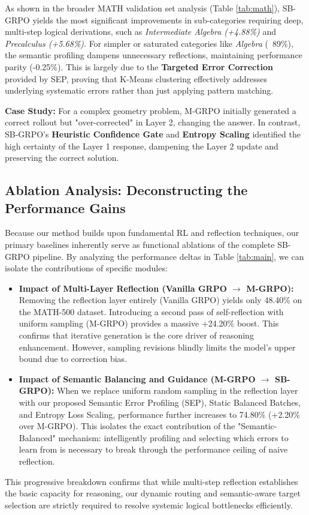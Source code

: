 \documentclass[runningheads]{llncs}
\begin{document}
As shown in the broader MATH validation set analysis (Table \ref{tab:math}), SB-GRPO yields the most significant improvements in sub-categories requiring deep, multi-step logical derivations, such as \textit{Intermediate Algebra (+4.88\%)} and \textit{Precalculus (+5.68\%)}. For simpler or saturated categories like \textit{Algebra} (~89\%), the semantic profiling dampens unnecessary reflections, maintaining performance parity (-0.25\%). This is largely due to the \textbf{Targeted Error Correction} provided by SEP, proving that K-Means clustering effectively addresses underlying systematic errors rather than just applying pattern matching.

\textbf{Case Study:} For a complex geometry problem, M-GRPO initially generated a correct rollout but "over-corrected" in Layer 2, changing the answer. In contrast, SB-GRPO's \textbf{Heuristic Confidence Gate} and \textbf{Entropy Scaling} identified the high certainty of the Layer 1 response, dampening the Layer 2 update and preserving the correct solution.

\subsection{Ablation Analysis: Deconstructing the Performance Gains}
Because our method builds upon fundamental RL and reflection techniques, our primary baselines inherently serve as functional ablations of the complete SB-GRPO pipeline. By analyzing the performance deltas in Table \ref{tab:main}, we can isolate the contributions of specific modules:

\begin{itemize}
    \item \textbf{Impact of Multi-Layer Reflection (Vanilla GRPO $\rightarrow$ M-GRPO):} Removing the reflection layer entirely (Vanilla GRPO) yields only 48.40\% on the MATH-500 dataset. Introducing a second pass of self-reflection with uniform sampling (M-GRPO) provides a massive +24.20\% boost. This confirms that iterative generation is the core driver of reasoning enhancement. However, sampling revisions blindly limits the model's upper bound due to correction bias.
    \item \textbf{Impact of Semantic Balancing and Guidance (M-GRPO $\rightarrow$ SB-GRPO):} When we replace uniform random sampling in the reflection layer with our proposed Semantic Error Profiling (SEP), Static Balanced Batches, and Entropy Loss Scaling, performance further increases to 74.80\% (+2.20\% over M-GRPO). This isolates the exact contribution of the "Semantic-Balanced" mechanism: intelligently profiling and selecting which errors to learn from is necessary to break through the performance ceiling of naive reflection.
\end{itemize}
This progressive breakdown confirms that while multi-step reflection establishes the basic capacity for reasoning, our dynamic routing and semantic-aware target selection are strictly required to resolve systemic logical bottlenecks efficiently.
\end{document}
